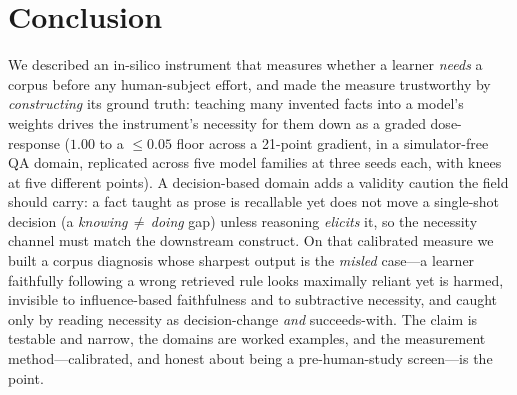 \documentclass{article}
\begin{document}
\section{Conclusion}
\label{sec:conclusion}
We described an in-silico instrument that measures whether a learner \emph{needs} a corpus before any
human-subject effort, and made the measure trustworthy by \emph{constructing} its ground truth:
teaching many invented facts into a model's weights drives the instrument's necessity for them down as
a graded dose-response ($1.00$ to a $\le\!0.05$ floor across a 21-point gradient, in a simulator-free
QA domain, replicated across five model families at three seeds each, with knees at five different
points). A decision-based domain adds a validity caution the field should carry:
a fact taught as prose is recallable yet does not move a single-shot decision (a
\emph{knowing\,$\neq$\,doing} gap) unless reasoning \emph{elicits} it, so the necessity channel must
match the downstream construct. On that calibrated measure we built a corpus diagnosis whose sharpest
output is the \emph{misled} case---a learner faithfully following a wrong retrieved rule looks maximally
reliant yet is harmed, invisible to influence-based faithfulness and to subtractive necessity, and
caught only by reading necessity as decision-change \emph{and} succeeds-with. The claim is testable and
narrow, the domains are worked examples, and the measurement method---calibrated, and honest about
being a pre-human-study screen---is the point.
\end{document}

